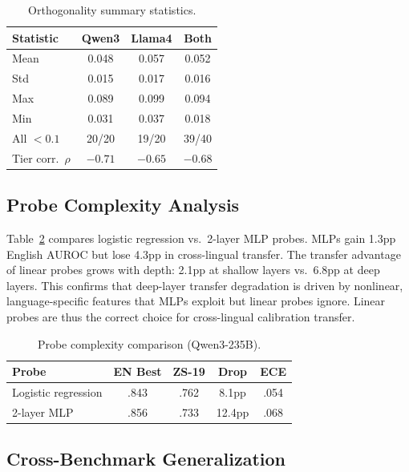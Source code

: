 \documentclass[11pt,a4paper]{article}
\begin{document}
\begin{table}[t]
\centering
\small
\caption{Orthogonality summary statistics.}
\label{tab:ortho_summary}
\begin{tabular}{lccc}
\toprule
Statistic & Qwen3 & Llama4 & Both \\
\midrule
Mean & 0.048 & 0.057 & 0.052 \\
Std & 0.015 & 0.017 & 0.016 \\
Max & 0.089 & 0.099 & 0.094 \\
Min & 0.031 & 0.037 & 0.018 \\
All $<0.1$ & 20/20 & 19/20 & 39/40 \\
Tier corr.\ $\rho$ & $-0.71$ & $-0.65$ & $-0.68$ \\
\bottomrule
\end{tabular}
\end{table}

\subsection{Probe Complexity Analysis}
\label{sec:res_probe}

Table~\ref{tab:probe_complexity} compares logistic regression vs.\ 2-layer MLP probes. MLPs gain 1.3pp English AUROC but lose 4.3pp in cross-lingual transfer. The transfer advantage of linear probes grows with depth: 2.1pp at shallow layers vs.\ 6.8pp at deep layers. This confirms that deep-layer transfer degradation is driven by nonlinear, language-specific features that MLPs exploit but linear probes ignore. Linear probes are thus the correct choice for cross-lingual calibration transfer.

\begin{table}[t]
\centering
\small
\caption{Probe complexity comparison (Qwen3-235B).}
\label{tab:probe_complexity}
\begin{tabular}{lcccc}
\toprule
Probe & EN Best & ZS-19 & Drop & ECE \\
\midrule
Logistic regression & .843 & .762 & 8.1pp & .054 \\
2-layer MLP & .856 & .733 & 12.4pp & .068 \\
\bottomrule
\end{tabular}
\end{table}

\subsection{Cross-Benchmark Generalization}
\label{sec:res_benchmark}
\end{document}
